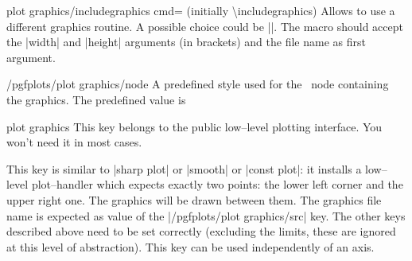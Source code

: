 {
\begin{pgfplotskey}{plot graphics/includegraphics cmd= (initially \textbackslash includegraphics)}
	Allows to use a different graphics routine. A possible choice could be |\pgfimage|. The macro should accept the |width| and |height| arguments (in brackets) and the file name as first argument.
\end{pgfplotskey}
\begin{stylekey}{/pgfplots/plot graphics/node}
	A predefined style used for the \Tikz\ node containing the graphics. The predefined value is
\begin{codeexample}
\end{codeexample}
\end{stylekey}

\begin{pgfplotskey}{plot graphics}
	This key belongs to the public low--level plotting interface. You won't need it in most cases.

	This key is similar to |sharp plot| or |smooth| or |const plot|: it installs a low--level plot--handler which expects exactly two points: the lower left corner and the upper right one. The graphics will be drawn between them. The graphics file name is expected as value of the |/pgfplots/plot graphics/src| key. The other keys described above need to be set correctly (excluding the limits, these are ignored at this level of abstraction). This key can be used independently of an axis.
\end{pgfplotskey}

}
